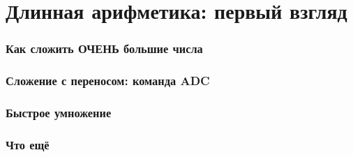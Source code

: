 \documentclass[pdf,9pt,aspectratio=169]{beamer}
\begin{document}
\section{Длинная арифметика: первый взгляд}

\begin{frame}[fragile]\frametitle{Как сложить ОЧЕНЬ большие числа}
\end{frame}

\begin{frame}[fragile]\frametitle{Сложение с переносом: команда ADC}
\end{frame}

\begin{frame}[fragile]\frametitle{Быстрое умножение}
\end{frame}

\begin{frame}[fragile]\frametitle{Что ещё}
\end{frame}
\end{document}

